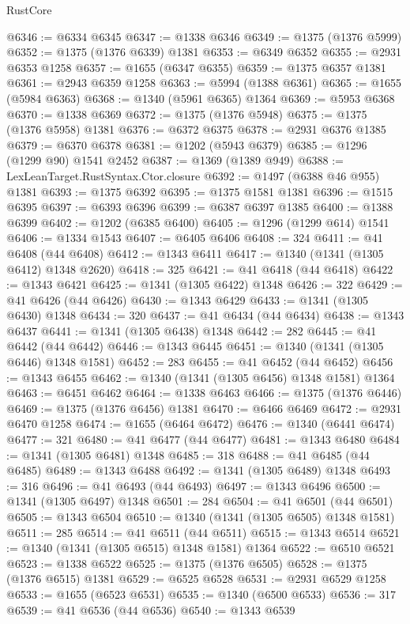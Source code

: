 \begin{lexlean}{RustCore}
\begin{coremodule}
@6346 := @6334 @6345
@6347 := @1338 @6346
@6349 := @1375 (@1376 @5999)
@6352 := @1375 (@1376 @6339) @1381
@6353 := @6349 @6352
@6355 := @2931 @6353 @1258
@6357 := @1655 (@6347 @6355)
@6359 := @1375 @6357 @1381
@6361 := @2943 @6359 @1258
@6363 := @5994 (@1388 @6361)
@6365 := @1655 (@5984 @6363)
@6368 := @1340 (@5961 @6365) @1364
@6369 := @5953 @6368
@6370 := @1338 @6369
@6372 := @1375 (@1376 @5948)
@6375 := @1375 (@1376 @5958) @1381
@6376 := @6372 @6375
@6378 := @2931 @6376 @1385
@6379 := @6370 @6378
@6381 := @1202 (@5943 @6379)
@6385 := @1296 (@1299 @90) @1541 @2452
@6387 := @1369 (@1389 @949)
@6388 := LexLeanTarget.RustSyntax.Ctor.closure
@6392 := @1497 (@6388 @46 @955) @1381
@6393 := @1375 @6392
@6395 := @1375 @1581 @1381
@6396 := @1515 @6395
@6397 := @6393 @6396
@6399 := @6387 @6397 @1385
@6400 := @1388 @6399
@6402 := @1202 (@6385 @6400)
@6405 := @1296 (@1299 @614) @1541
@6406 := @1334 @1543
@6407 := @6405 @6406
@6408 := 324
@6411 := @41 @6408 (@44 @6408)
@6412 := @1343 @6411
@6417 := @1340 (@1341 (@1305 @6412) @1348 @2620)
@6418 := 325
@6421 := @41 @6418 (@44 @6418)
@6422 := @1343 @6421
@6425 := @1341 (@1305 @6422) @1348
@6426 := 322
@6429 := @41 @6426 (@44 @6426)
@6430 := @1343 @6429
@6433 := @1341 (@1305 @6430) @1348
@6434 := 320
@6437 := @41 @6434 (@44 @6434)
@6438 := @1343 @6437
@6441 := @1341 (@1305 @6438) @1348
@6442 := 282
@6445 := @41 @6442 (@44 @6442)
@6446 := @1343 @6445
@6451 := @1340 (@1341 (@1305 @6446) @1348 @1581)
@6452 := 283
@6455 := @41 @6452 (@44 @6452)
@6456 := @1343 @6455
@6462 := @1340 (@1341 (@1305 @6456) @1348 @1581) @1364
@6463 := @6451 @6462
@6464 := @1338 @6463
@6466 := @1375 (@1376 @6446)
@6469 := @1375 (@1376 @6456) @1381
@6470 := @6466 @6469
@6472 := @2931 @6470 @1258
@6474 := @1655 (@6464 @6472)
@6476 := @1340 (@6441 @6474)
@6477 := 321
@6480 := @41 @6477 (@44 @6477)
@6481 := @1343 @6480
@6484 := @1341 (@1305 @6481) @1348
@6485 := 318
@6488 := @41 @6485 (@44 @6485)
@6489 := @1343 @6488
@6492 := @1341 (@1305 @6489) @1348
@6493 := 316
@6496 := @41 @6493 (@44 @6493)
@6497 := @1343 @6496
@6500 := @1341 (@1305 @6497) @1348
@6501 := 284
@6504 := @41 @6501 (@44 @6501)
@6505 := @1343 @6504
@6510 := @1340 (@1341 (@1305 @6505) @1348 @1581)
@6511 := 285
@6514 := @41 @6511 (@44 @6511)
@6515 := @1343 @6514
@6521 := @1340 (@1341 (@1305 @6515) @1348 @1581) @1364
@6522 := @6510 @6521
@6523 := @1338 @6522
@6525 := @1375 (@1376 @6505)
@6528 := @1375 (@1376 @6515) @1381
@6529 := @6525 @6528
@6531 := @2931 @6529 @1258
@6533 := @1655 (@6523 @6531)
@6535 := @1340 (@6500 @6533)
@6536 := 317
@6539 := @41 @6536 (@44 @6536)
@6540 := @1343 @6539

\end{coremodule}
\end{lexlean}
